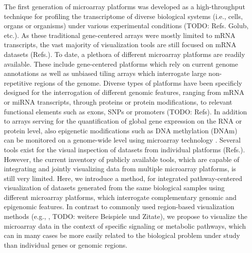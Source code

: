 \documentclass{bioinfo}
\begin{document}
The first generation of microarray platforms was developed as a high-throughput technique for profiling the transcriptome of diverse biological systems (i.e., cells, organs or organisms) under various experimental conditions (TODO: Refs. Golub, etc.). As these traditional gene-centered arrays were mostly limited to mRNA transcripts, the vast majority of visualization tools are still focused on mRNA datasets (Refs.). To date, a plethora of different microarray platforms are readily available. These include gene-centered platforms which rely on current genome annotations as well as unbiased tiling arrays which interrogate large non-repetitive regions of the genome. Diverse types of platforms have been specificly designed for the interrogation of different genomic features, ranging from mRNA or miRNA transcripts, through  proteins or protein modifications, to relevant functional elements such as exons, SNPs or promoters (TODO: Refs). In addition to arrays serving for the quantification of global gene expression on the RNA or protein level, also epigenetic modifications such as DNA methylation (DNAm) can be monitored on a genome-wide level using microarray technology \citep{Hoheisel2006}.
Several tools exist for the visual inspection of datasets from individual platforms (Refs.). However, the current inventory of publicly available tools, which are capable of integrating and jointly visualizing data from multiple microarray platforms, is still very limited.
Here, we introduce a method, for integrated pathway-centered visualization of datasets generated from the same biological samples using different microarray platforms, which interrogate complementary genomic and epigenomic features. 
In contrast to commonly used region-based visualization methods (e.g., \citep[see][]{UCSCBrowser}, TODO: weitere Beispiele und Zitate), we propose to visualize the microarray data in the context of specific signaling or metabolic pathways, which can in many cases be more easily related to the biological problem under study than individual genes or genomic regions.  
\end{document}
